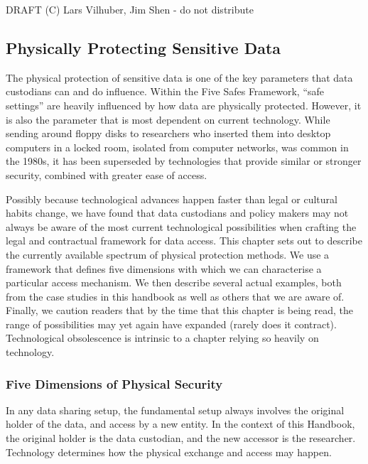 \begin{center}
 DRAFT (C) Lars Vilhuber, Jim Shen - do not distribute    
\end{center}

\hypertarget{physically-protecting-sensitive-data}{%
\subsection{Physically Protecting Sensitive
Data}\label{physically-protecting-sensitive-data}}

The physical protection of sensitive data is one of the key parameters
that data custodians can and do influence. Within the Five Safes
Framework, ``safe settings'' are heavily influenced by how data are
physically protected. However, it is also the parameter that is most
dependent on current technology. While sending around floppy disks to
researchers who inserted them into desktop computers in a locked room,
isolated from computer networks, was common in the 1980s, it has been
superseded by technologies that provide similar or stronger security,
combined with greater ease of access.

Possibly because technological advances happen faster than legal or
cultural habits change, we have found that data custodians and policy
makers may not always be aware of the most current technological
possibilities when crafting the legal and contractual framework for data
access. This chapter sets out to describe the currently available
spectrum of physical protection methods. We use a framework that defines
five dimensions with which we can characterise a particular access
mechanism. We then describe several actual examples, both from the case
studies in this handbook as well as others that we are aware of.
Finally, we caution readers that by the time that this chapter is being
read, the range of possibilities may yet again have expanded (rarely
does it contract). Technological obsolescence is intrinsic to a chapter
relying so heavily on technology.

\hypertarget{five-dimensions-of-physical-security}{%
\subsubsection{Five Dimensions of Physical
Security}\label{five-dimensions-of-physical-security}}

In any data sharing setup, the fundamental setup always involves the
original holder of the data, and access by a new entity. In the context
of this Handbook, the original holder is the data custodian, and the new
accessor is the researcher. Technology determines how the physical
exchange and access may happen.

